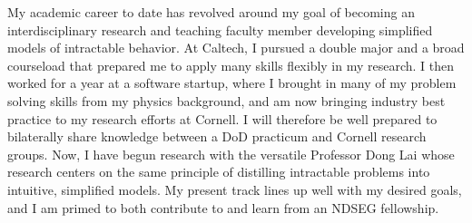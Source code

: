 \documentclass[11pt,
        usenames, %
        dvipsnames %
    ]{article}
\begin{document}
My academic career to date has revolved around my goal of becoming an
interdisciplinary research and teaching faculty member developing simplified
models of intractable behavior. At Caltech, I pursued a double major and a
broad courseload that prepared me to apply many skills flexibly in my research.
I then worked for a year at a software startup, where I brought in many of my
problem solving skills from my physics background, and am now bringing industry
best practice to my research efforts at Cornell. I will therefore be well
prepared to bilaterally share knowledge between a DoD practicum and Cornell
research groups. Now, I have begun research with the versatile Professor Dong
Lai whose research centers on the same principle of distilling intractable
problems into intuitive, simplified models. My present track lines up well with
my desired goals, and I am primed to both contribute to and learn from an NDSEG
fellowship.

\end{document}

